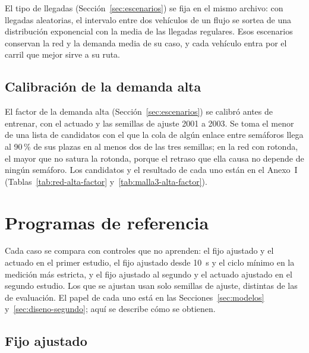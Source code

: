 El tipo de llegadas (Sección~\ref{sec:escenarios}) se fija en el mismo
archivo: con llegadas aleatorias, el intervalo entre dos vehículos de
un flujo se sortea de una distribución exponencial con la media de las
llegadas regulares. Esos escenarios conservan la red y la demanda media
de su caso, y cada vehículo entra por el carril que mejor sirve a su
ruta.

\subsection{Calibración de la demanda alta}
\label{sec:calibracion}

El factor de la demanda alta (Sección~\ref{sec:escenarios}) se calibró
antes de entrenar, con el actuado y las semillas de ajuste 2001 a 2003.
Se toma el menor de una lista de candidatos con el que la cola de algún
enlace entre semáforos llega al 90\,\% de sus plazas en al menos dos de
las tres semillas; en la red con rotonda, el mayor que no satura la
rotonda, porque el retraso que ella causa no depende de ningún
semáforo. Los candidatos y el resultado de cada uno están en el
Anexo~I (Tablas~\ref{tab:red-alta-factor}
y~\ref{tab:malla3-alta-factor}).


\section{Programas de referencia}
\label{sec:referencias-fijas}

Cada caso se compara con controles que no aprenden: el fijo ajustado y
el actuado en el primer estudio, el fijo ajustado desde 10~s y el ciclo
mínimo en la medición más estricta, y el fijo ajustado al segundo y el
actuado ajustado en el segundo estudio. Los que se ajustan usan solo
semillas de ajuste, distintas de las de evaluación. El papel de cada
uno está en las Secciones~\ref{sec:modelos}
y~\ref{sec:diseno-segundo}; aquí se describe cómo se obtienen.

\subsection{Fijo ajustado}

